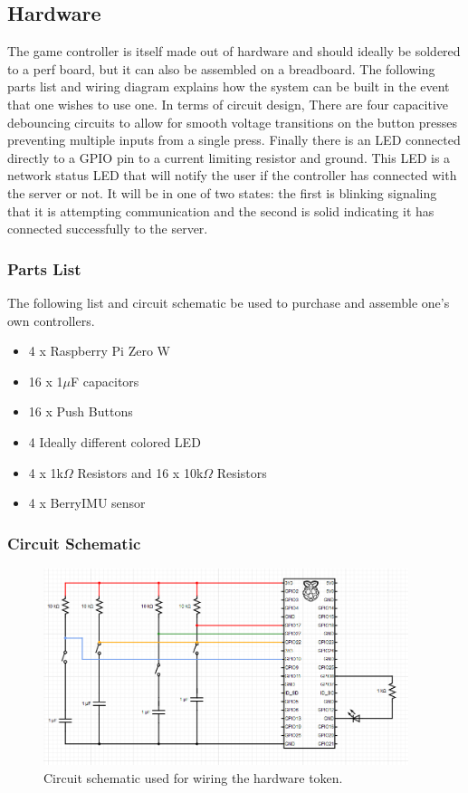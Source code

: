 \documentclass[a4paper,10pt]{article}
\begin{document}
\subsection{Hardware}
The game controller is itself made out of hardware and should ideally be soldered to a perf board, but it can also be assembled on a breadboard. The following parts list and wiring diagram explains how the system can be built in the event that one wishes to use one. In terms of circuit design, There are four capacitive debouncing circuits to allow for smooth voltage transitions on the button presses preventing multiple inputs from a single press. Finally there is an LED connected directly to a GPIO pin to a current limiting resistor and ground. This LED is a network status LED that will notify the user if the controller has connected with the server or not. It will be in one of two states: the first is blinking signaling that it is attempting communication and the second is solid indicating it has connected successfully to the server.

\subsubsection{Parts List}
The following list and circuit schematic be used to purchase and assemble one's own controllers.

\singlespacing
\begin{itemize}
\item 4 x Raspberry Pi Zero W
\item 16 x 1$\mu$F capacitors
\item 16 x Push Buttons
\item 4 Ideally different colored LED
\item 4 x 1k$\Omega$ Resistors and 16 x 10k$\Omega$ Resistors
\item 4 x BerryIMU sensor
\end{itemize}
\doublespacing

\subsubsection{Circuit Schematic}

\begin{figure}[H]
  \centering
      \includegraphics[width=0.95\textwidth]{Assets/circuit.png}
  \caption{Circuit schematic used for wiring the hardware token.}
\end{figure}
\end{document}
